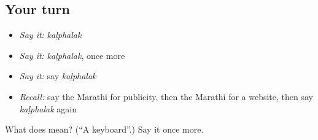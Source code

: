 \subsection*{Your turn}
\begin{itemize}
\raggedright
  \item \emph{Say it:} \emph{kaḷphalak}
  \item \emph{Say it:} \emph{kaḷphalak}, once more
  \item \emph{Say it:} say \emph{kaḷphalak}
  \item \emph{Recall:} say the Marathi for publicity, then the Marathi for a website, then say \emph{kaḷphalak} again
\end{itemize}

\begin{tcolorbox}[breakable,colback=teal!4,colframe=teal!35!black,title={Before you move on}]
What does  mean? (\textquotedblleft{}A keyboard\textquotedblright{}.) Say it once more.
\end{tcolorbox}
